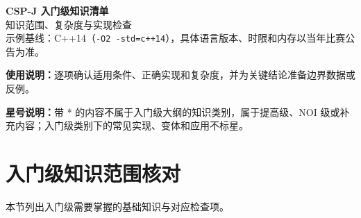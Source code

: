 \documentclass[a4paper,11pt]{article}
\newcommand{\code}[1]{\texttt{#1}}
\begin{document}
\thispagestyle{empty}
\begin{center}
{\LARGE\bfseries CSP-J 入门级知识清单} \\
\vspace{3mm}
{\large 知识范围、复杂度与实现检查} \\
\vspace{3mm}
{\small 示例基线：C++14（\code{-O2 -std=c++14}），具体语言版本、时限和内存以当年比赛公告为准。}
\end{center}

{\small\textbf{使用说明：}逐项确认适用条件、正确实现和复杂度，并为关键结论准备边界数据或反例。}

{\small\textbf{星号说明：}带 * 的内容不属于入门级大纲的知识类别，属于提高级、NOI 级或补充内容；入门级类别下的常见实现、变体和应用不标星。}

\vspace{2mm}
\tableofcontents
\newpage

\section{入门级知识范围核对}

本节列出入门级需要掌握的基础知识与对应检查项。
\end{document}
